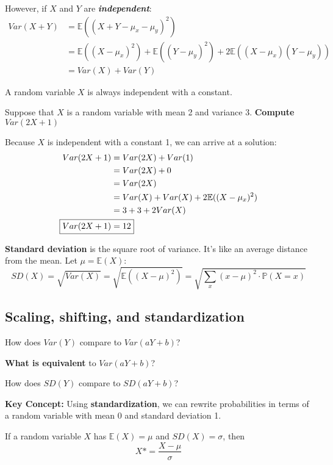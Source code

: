 \documentclass[titlepage, 12pt, leqno]{article}
\begin{document}
However, if $X$ and $Y$ are \textbf{\textit{independent}}:
\begin{align*}
    Var(X+Y) &= \mathbb{E}((X+Y-\mu_x-\mu_y)^2) \\
             &= \mathbb{E}((X-\mu_x)^2) + \mathbb{E}((Y-\mu_y)^2) +
             2 \mathbb{E}((X-\mu_x)(Y-\mu_y)) \\
             &= Var(X) + Var(Y)
\end{align*}

\begin{note}
    A random variable $X$ is always independent with a constant.
\end{note}

\begin{ex}
    Suppose that $X$ is a random variable with mean 2 and variance 3. 
    \textbf{Compute} $Var(2X+1)$
    \vspace{10px}
    
    Because $X$ is independent with a constant 1, we can arrive at a solution:
   \begin{align*}
       Var(2X+1) &= Var(2X) + Var(1) \\
                 &= Var(2X) + 0 \\
                 &= Var(2X) \\
                 &= Var(X) + Var(X) + 2 \mathbb{E}((X-\mu_x)^2) \\
                 &= 3 + 3 + 2 Var(X) \\
       \Aboxed{Var(2X+1)  &= 12} 
   \end{align*}
\end{ex}

\begin{definition}
    \textbf{Standard deviation} is the square root of variance. It's like an
    average distance from the mean. Let $\mu = \mathbb{E}(X)$:
\[
SD(X) = \sqrt{Var(X)} = \sqrt{ \mathbb{E}((X-\mu)^2)}
= \sqrt{\sum_{x}(x-\mu)^2\cdot \mathbb{P}(X=x)}
\]
\end{definition}

\subsection{Scaling, shifting, and standardization}
How does $Var(Y)$ compare to $Var(aY+b)$?

\begin{ex}
    \textbf{What is equivalent} to $Var(aY+b)$?
\end{ex}

\begin{ex}
    How does $SD(Y)$ compare to $SD(aY+b)$?
\end{ex}

\textbf{Key Concept:}
Using \textbf{standardization}, we can rewrite probabilities in terms of a random
variable with mean 0 and standard deviation 1.

If a random variable $X$ has $ \mathbb{E}(X) = \mu$ and $SD(X) = \sigma$, then
\[
    X* = \frac{X-\mu}{\sigma}
\]
\end{document}

